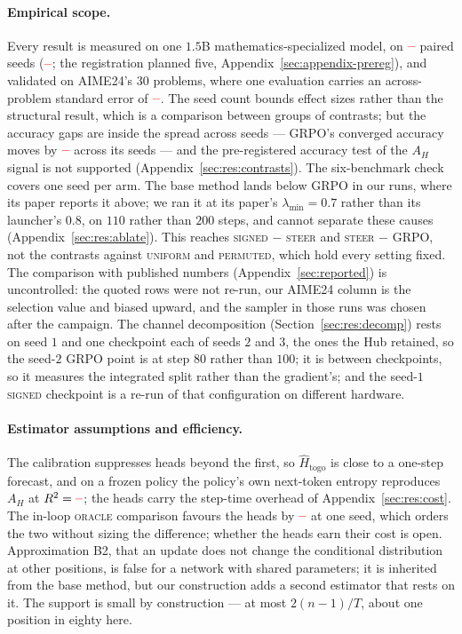 \documentclass[11pt]{article}
\newcommand{\AH}{A_{H}}
\providecommand{\PENDING}{\textcolor{red}{\textbf{--}}}
\newcommand{\num}[1]{\ifcsname #1\endcsname\csname #1\endcsname\else\PENDING\fi}
\begin{document}
\paragraph{Empirical scope.} Every result is measured on one $1.5$B
mathematics-specialized model, on $\num{Nseedsused}$ paired seeds
($\num{Seedset}$; the registration planned five, Appendix~\ref{sec:appendix-prereg}),
and validated on AIME24's $30$ problems, where one evaluation carries an
across-problem standard error of $\num{SEaime}$. The seed count bounds effect sizes
rather than the structural result, which is a comparison between groups of contrasts;
but the accuracy gaps are inside the spread across seeds --- GRPO's converged accuracy
moves by $\num{Sgrpoacc}$ across its seeds --- and the pre-registered accuracy test of
the $\AH$ signal is not supported (Appendix~\ref{sec:res:contrasts}). The six-benchmark
check covers one seed per arm. The base method lands below GRPO in our runs, where its
paper reports it above; we ran it at its paper's $\lambda_{\min} = 0.7$ rather than its
launcher's $0.8$, on $110$ rather than $200$ steps, and cannot separate these causes
(Appendix~\ref{sec:res:ablate}). This reaches \textsc{signed} $-$ \textsc{steer} and
\textsc{steer} $-$ GRPO, not the contrasts against \textsc{uniform} and
\textsc{permuted}, which hold every setting fixed. The comparison with published
numbers (Appendix~\ref{sec:reported}) is uncontrolled: the quoted rows were not
re-run, our AIME24 column is the selection value and biased upward, and the sampler in
those runs was chosen after the campaign. The channel decomposition
(Section~\ref{sec:res:decomp}) rests on seed $1$ and one checkpoint each of seeds $2$
and $3$, the ones the Hub retained, so the seed-$2$ GRPO point is at step $80$ rather
than $100$; it is between checkpoints, so it measures the integrated split rather than
the gradient's; and the seed-$1$ \textsc{signed} checkpoint is a re-run of that
configuration on different hardware.

\paragraph{Estimator assumptions and efficiency.} The calibration suppresses heads
beyond the first, so $\hat{H}_{\mathrm{togo}}$ is close to a one-step forecast, and on a
frozen policy the policy's own next-token entropy reproduces $\AH$ at
$R^2 = \num{Locrsq}$; the heads carry the step-time overhead of
Appendix~\ref{sec:res:cost}. The in-loop \textsc{oracle} comparison favours the heads
by $\num{Fsignedoracleacc}$ at one seed, which orders the two without sizing the
difference; whether the heads earn their cost is open. Approximation B2, that an
update does not change the conditional distribution at other positions, is false for
a network with shared parameters; it is inherited from the base method, but our
construction adds a second estimator that rests on it. The support is small by
construction --- at most $2(n-1)/T$, about one position in eighty here.
\end{document}
